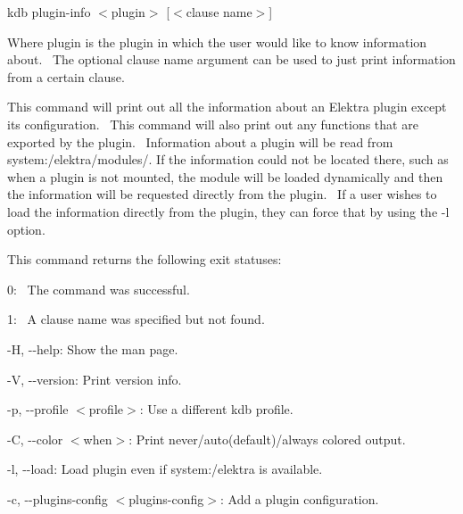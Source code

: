 {\ttfamily kdb plugin-\/info $<$plugin$>$ \mbox{[}$<$clause name$>$\mbox{]}}~\newline


Where {\ttfamily plugin} is the plugin in which the user would like to know information about.~\newline
 The optional {\ttfamily clause name} argument can be used to just print information from a certain clause.~\newline


This command will print out all the information about an Elektra plugin except it\textquotesingle{}s configuration.~\newline
 This command will also print out any functions that are exported by the plugin.~\newline
 Information about a plugin will be read from {\ttfamily system\+:/elektra/modules/}. If the information could not be located there, such as when a plugin is not mounted, the module will be loaded dynamically and then the information will be requested directly from the plugin.~\newline
 If a user wishes to load the information directly from the plugin, they can force that by using the {\ttfamily -\/l} option.~\newline


This command returns the following exit statuses\+:~\newline



\begin{DoxyItemize}
\item 0\+:~\newline
 The command was successful.~\newline

\item 1\+:~\newline
 A {\ttfamily clause name} was specified but not found.~\newline

\end{DoxyItemize}


\begin{DoxyItemize}
\item {\ttfamily -\/H}, {\ttfamily -\/-\/help}\+: Show the man page.
\item {\ttfamily -\/V}, {\ttfamily -\/-\/version}\+: Print version info.
\item {\ttfamily -\/p}, {\ttfamily -\/-\/profile $<$profile$>$}\+: Use a different kdb profile.
\item {\ttfamily -\/C}, {\ttfamily -\/-\/color $<$when$>$}\+: Print never/auto(default)/always colored output.
\item {\ttfamily -\/l}, {\ttfamily -\/-\/load}\+: Load plugin even if system\+:/elektra is available.
\item {\ttfamily -\/c}, {\ttfamily -\/-\/plugins-\/config $<$plugins-\/config$>$}\+: Add a plugin configuration.
\end{DoxyItemize}

